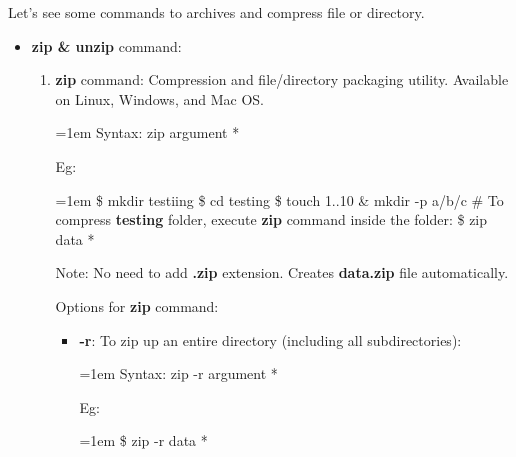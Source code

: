 \setlength{\columnsep}{3pt}
\begin{flushleft}
	Let's see some commands to archives and compress file or directory.
	\begin{itemize}
		\item \textbf{zip \& unzip} command: 
		\begin{enumerate}
			\item \textbf{zip} command: Compression and file/directory packaging utility. Available on Linux, Windows, and Mac OS. 
			\begin{tcolorbox}[breakable,notitle,boxrule=0pt,colback=pink,colframe=pink]
				\color{black}
				\font=1em
				Syntax: zip argument *
				\font=4pt
			\end{tcolorbox}
			Eg:
			\begin{tcolorbox}[breakable,notitle,boxrule=-0pt,colback=black,colframe=black]
				\color{green}
				\font=1em
				\$ mkdir testiing
				\newline
				\$ cd testing
				\newline
				\$ touch {1..10} \& mkdir -p a/b/c
				\newline
				\color{white}
				\# To compress \textbf{testing} folder, execute \textbf{zip} command inside the folder:
				\newline
				\color{green}
				\$ zip data *
				\font=4pt
			\end{tcolorbox}
			
			\bigskip
			\begin{tcolorbox}[breakable,notitle,boxrule=0pt,colback=yellow,colframe=yellow]
				\color{black}
				Note: No need to add \textbf{.zip} extension. Creates \textbf{data.zip} file automatically.
			\end{tcolorbox}
			
			Options for \textbf{zip} command:
			\begin{itemize}
				\item \textbf{-r}: To zip up an entire directory (including all subdirectories):
				\begin{tcolorbox}[breakable,notitle,boxrule=0pt,colback=pink,colframe=pink]
					\color{black}
					\font=1em
					Syntax: zip -r argument *
					\font=4pt
				\end{tcolorbox}
				Eg:
				\begin{tcolorbox}[breakable,notitle,boxrule=-0pt,colback=black,colframe=black]
					\color{green}
					\font=1em
					\$ zip -r data *
					\font=4pt
				\end{tcolorbox}
					

\end{itemize}
\end{enumerate}
\end{itemize}
\end{flushleft}
